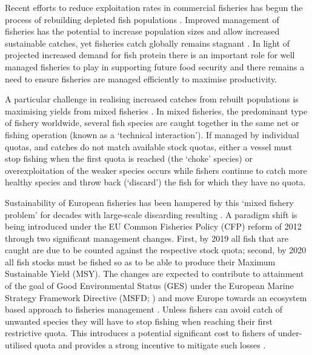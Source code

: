 \documentclass{nature}
\begin{document}
\begin{linenumbers}
Recent efforts to reduce exploitation rates in commercial fisheries has begun
the process of rebuilding depleted fish populations \cite{Worm2009}.  Improved
management of fisheries has the potential to increase population sizes and
allow increased sustainable catches, yet fisheries catch globally remains
stagnant \cite{FAO2016}. In light of projected increased demand for fish
protein \cite{B??n??2016} there is an important role for well managed fisheries
to play in supporting future food security \cite{Mcclanahan2015} and there
remains a need to ensure fisheries are managed efficiently to maximise
productivity.

A particular challenge in realising increased catches from rebuilt populations
is maximising yields from mixed fisheries \cite{Branch2008, Kuriyama2016,
	Ulrich2016}. In mixed fisheries, the predominant type
of fishery worldwide, several fish species are caught together in the same net
or fishing operation (known as a `technical interaction'). If managed by
individual quotas, and catches do not match available stock quotas, either a
vessel must stop fishing when the first quota is reached (the `choke' species)
or overexploitation of the weaker species occurs while fishers continue to
catch more healthy species and throw back (`discard') the fish for which they
have no quota.

Sustainability of European fisheries has been hampered by this `mixed fishery
problem' for decades with large-scale discarding resulting \cite{Borges2015,
	Uhlmann2014}.  A paradigm shift is being introduced under the EU Common
Fisheries Policy (CFP) reform of 2012 through two significant management
changes.  First, by 2019 all fish that are caught are due to be counted against
the respective stock quota; second, by 2020 all fish stocks must be fished so
as to be able to produce their Maximum Sustainable Yield
(MSY)\cite{EuropeanParliamentandCounciloftheEuropeanUnion2013}. The changes are
expected to contribute to attainment of the goal of Good Environmental Status
(GES) under the European Marine Strategy Framework Directive (MSFD;
\cite{EuropeanParliament2008}) and move Europe towards an ecosystem based
approach to fisheries management \cite{Garcia2003}. Unless fishers can avoid
catch of unwanted species they will have to stop fishing when reaching their
first restrictive quota. This introduces a potential significant cost to
fishers of under-utilised quota\cite{Hoff2010a, Ulrich2016} and provides a
strong incentive to mitigate such losses \cite{Condie2013, Condie2013a}. 


\end{linenumbers}
\end{document}
